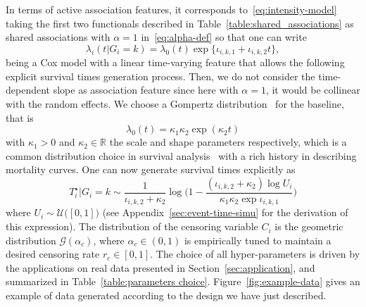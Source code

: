 \documentclass[11pt]{article}
\newcommand{\cG}{\mathcal G}
\newcommand{\cU}{\mathcal U}
\newcommand{\R}{\mathds R}
\begin{document}
In terms of active association features, it corresponds to~\eqref{eq:intensity-model} taking the first two functionals described in Table~\ref{table:shared_associations} as shared associations with $\alpha = 1$ in~\eqref{eq:alpha-def} so that one can write
\[ \lambda_i(t|G_i = k) = \lambda_0(t) \exp \big\{ \iota_{i,k,1} + \iota_{i,k,2} t \big\},\]
being a Cox model with a linear time-varying feature that allows the following explicit survival times generation process. Then, we do not consider the time-dependent slope as association feature since here with $\alpha = 1$, it would be collinear with the random effects.
We choose a Gompertz distribution~\citep{gompertz1825xxiv} for the baseline, that is
\begin{equation}
  \label{eq:baseline}
  \lambda_0(t) = \kappa_1 \kappa_2 \exp(\kappa_2t)
\end{equation}
with $\kappa_1 > 0$ and $\kappa_2 \in \R$ the scale and shape parameters respectively, which is a common distribution choice in survival analysis~\citep{klein2005survival} with a rich history in describing mortality curves. One can now generate survival times explicitly as
\begin{equation}
  \label{eq:time-generation}
  T_i^\star | G_i=k \sim \dfrac{1}{\iota_{i,k,2} + \kappa_2} \log \Big(1 - \dfrac{(\iota_{i,k,2} + \kappa_2) \log U_i}{\kappa_1 \kappa_2 \exp\iota_{i,k,1}} \Big)
\end{equation}
where $U_i \sim \cU\big([0,1]\big)$ (see Appendix~\ref{sec:event-time-simu} for the derivation of this expression).
The distribution of the censoring variable $C_i$ is the geometric distribution $\cG(\alpha_c)$, where $\alpha_c \in (0, 1)$ is empirically tuned to maintain a desired censoring rate $r_c \in [0,1]$. 
The choice of all hyper-parameters is driven by the applications on real data presented in Section~\ref{sec:application}, and summarized in Table~\ref{table:parameters choice}. Figure~\ref{fig:example-data} gives an example of data generated according to the design we have just described.
\begin{table}[htb]
\caption{Hyper-parameter choices for simulation. Let us also precise that we take $n \in [200, 4000]$ and $(p, L) \in [3, 300]^2$.
\label{table:parameters choice}}
\centering
{}
\end{table}
\end{document}
